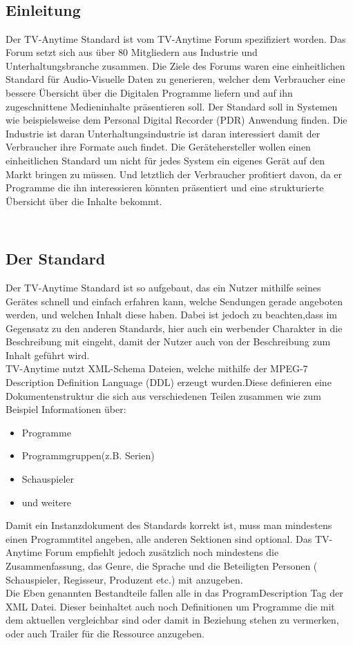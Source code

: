 	\subsection{\\Einleitung\\}
Der TV-Anytime Standard ist vom TV-Anytime Forum spezifiziert worden. Das Forum setzt sich aus über 80 Mitgliedern aus Industrie und Unterhaltungsbranche zusammen. Die Ziele des Forums waren eine einheitlichen Standard für Audio-Visuelle Daten zu generieren, welcher dem Verbraucher eine bessere Übersicht über die Digitalen Programme liefern und auf ihn zugeschnittene Medieninhalte präsentieren soll.
Der Standard soll in Systemen wie beispielsweise dem Personal Digital Recorder (PDR) Anwendung finden. Die Industrie ist daran Unterhaltungsindustrie ist daran interessiert damit der Verbraucher ihre Formate auch findet. Die Gerätehersteller wollen einen einheitlichen Standard um nicht für jedes System ein eigenes Gerät auf den Markt bringen zu müssen. Und letztlich der Verbraucher profitiert davon, da er Programme die ihn interessieren könnten präsentiert und eine strukturierte Übersicht über die Inhalte bekommt.

\subsection{\\Der Standard\\}
Der TV-Anytime Standard ist so aufgebaut, das ein Nutzer mithilfe seines Gerätes schnell und einfach erfahren kann, welche Sendungen gerade angeboten werden, und welchen Inhalt diese haben. Dabei ist jedoch zu beachten,dass im Gegensatz zu den anderen Standards, hier auch ein werbender Charakter in die Beschreibung mit eingeht, damit der Nutzer auch von der Beschreibung zum Inhalt geführt wird.\\TV-Anytime nutzt XML-Schema Dateien, welche mithilfe der MPEG-7 Description Definition Language (DDL) erzeugt wurden.Diese definieren eine Dokumentenstruktur die sich aus verschiedenen Teilen zusammen wie zum Beispiel Informationen über:
\begin{itemize}
	\item Programme
	\item Programmgruppen(z.B. Serien)
	\item Schauspieler
	\item und weitere
\end{itemize}
 Damit ein Instanzdokument des Standards korrekt ist, muss man mindestens einen Programmtitel angeben, alle anderen Sektionen sind optional. Das TV-Anytime Forum empfiehlt jedoch zusätzlich noch mindestens die Zusammenfassung, das Genre, die Sprache und die Beteiligten Personen ( Schauspieler, Regisseur, Produzent etc.) mit anzugeben.\\Die Eben genannten Bestandteile fallen alle in das ProgramDescription Tag der XML Datei. Dieser beinhaltet auch noch Definitionen um Programme die mit dem aktuellen vergleichbar sind oder damit in Beziehung stehen zu vermerken, oder auch Trailer für die Ressource anzugeben.
 
